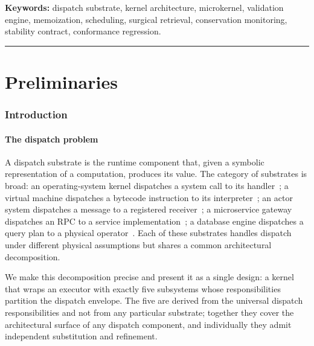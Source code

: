 \documentclass[twocolumn,11pt,a4paper]{article}
\begin{document}
\noindent\textbf{Keywords:} dispatch substrate, kernel architecture, microkernel, validation engine, memoization, scheduling, surgical retrieval, conservation monitoring, stability contract, conformance regression.

\tableofcontents

\vspace{6pt}
\hrule
\vspace{6pt}

\part{Preliminaries}

\section{Introduction}
\label{sec:intro}

\subsection{The dispatch problem}

A dispatch substrate is the runtime component that, given a symbolic representation of a computation, produces its value. The category of substrates is broad: an operating-system kernel dispatches a system call to its handler~\citep{tanenbaum2014modern,liedtke1995microkernel,klein2009sel4}; a virtual machine dispatches a bytecode instruction to its interpreter~\citep{lindholm2014jvm}; an actor system dispatches a message to a registered receiver~\citep{hewitt1973actor,agha1986actors,armstrong2003erlang}; a microservice gateway dispatches an RPC to a service implementation~\citep{birrell1984rpc}; a database engine dispatches a query plan to a physical operator~\citep{graefe1993query}. Each of these substrates handles dispatch under different physical assumptions but shares a common architectural decomposition.

We make this decomposition precise and present it as a single design: a kernel that wraps an executor with exactly five subsystems whose responsibilities partition the dispatch envelope. The five are derived from the universal dispatch responsibilities and not from any particular substrate; together they cover the architectural surface of any dispatch component, and individually they admit independent substitution and refinement.
\end{document}
